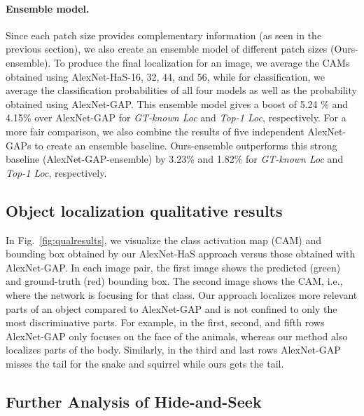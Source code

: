 \vspace{-10pt}
\paragraph{Ensemble model.}  Since each patch size provides complementary information (as seen in the previous section), we also create an ensemble model of different patch sizes (Ours-ensemble).  To produce the final localization for an image, we average the CAMs obtained using AlexNet-HaS-16, 32, 44, and 56, while for classification, we average the classification probabilities of all four models as well as the probability obtained using AlexNet-GAP.  This ensemble model gives a boost of 5.24 \% and 4.15\% over AlexNet-GAP for \emph{GT-known Loc} and \emph{Top-1 Loc}, respectively.  For a more fair comparison, we also combine the results of five independent AlexNet-GAPs to create an ensemble baseline.  Ours-ensemble outperforms this strong baseline (AlexNet-GAP-ensemble) by 3.23\% and 1.82\% for \emph{GT-known Loc} and \emph{Top-1 Loc}, respectively.








\subsection{Object localization qualitative results}


In Fig.~\ref{fig:qualresults}, we visualize the class activation map (CAM) and bounding box obtained by our AlexNet-HaS approach versus those obtained with AlexNet-GAP.  In each image pair, the first image shows the predicted (green) and ground-truth (red) bounding box. The second image shows the CAM, i.e., where the network is focusing for that class.  Our approach localizes more relevant parts of an object compared to AlexNet-GAP and is not confined to only the most discriminative parts. For example, in the first, second, and fifth rows AlexNet-GAP only focuses on the face of the animals, whereas our method also localizes parts of the body.  Similarly, in the third and last rows AlexNet-GAP misses the tail for the snake and squirrel while ours gets the tail. 

\subsection{Further Analysis of Hide-and-Seek}


